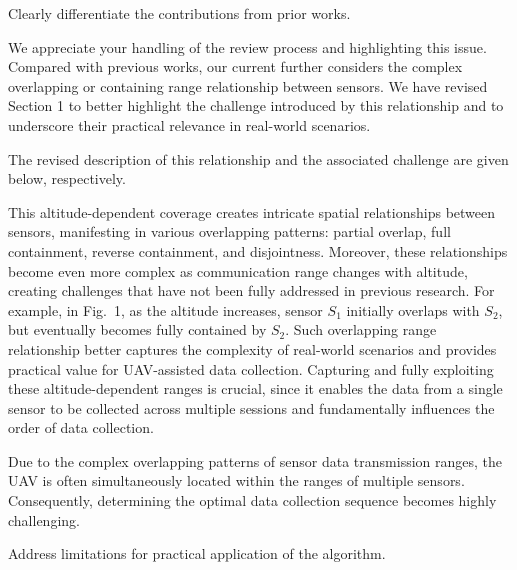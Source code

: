 \editor


\begin{metacomment}
	Clearly differentiate the contributions from prior works.
\end{metacomment}
\begin{metaresponse}
\end{metaresponse}
	We appreciate your handling of the review process and highlighting this issue.
	Compared with previous works, our current further considers the complex overlapping or containing range relationship between sensors.
	We have revised Section 1 to better highlight the challenge introduced by this relationship and to underscore their practical relevance in real-world scenarios.
	
	The revised description of this relationship and the associated challenge are given below, respectively.
	\begin{changes}
		This altitude-dependent coverage creates intricate spatial relationships between sensors, manifesting in various overlapping patterns: partial overlap, full containment, reverse containment, and disjointness.
		Moreover, these relationships become even more complex as communication range changes with altitude, creating challenges that have not been fully addressed in previous research.
		For example, in Fig.~1, as the altitude increases, sensor $S_1$ initially overlaps with $S_2$, but eventually becomes fully contained by $S_2$.
		Such overlapping range relationship better captures the complexity of real-world scenarios and provides practical value for UAV-assisted data collection.
		Capturing and fully exploiting these altitude-dependent ranges is crucial, since it enables the data from a single sensor to be collected across multiple sessions and fundamentally influences the order of data collection.
	\end{changes}
	\begin{changes}
		Due to the complex overlapping patterns of sensor data transmission ranges, the UAV is often simultaneously located within the ranges of multiple sensors. Consequently, determining the optimal data collection sequence becomes highly challenging.
	\end{changes}
\begin{metacomment}
	Address limitations for practical application of the algorithm.
\end{metacomment}
